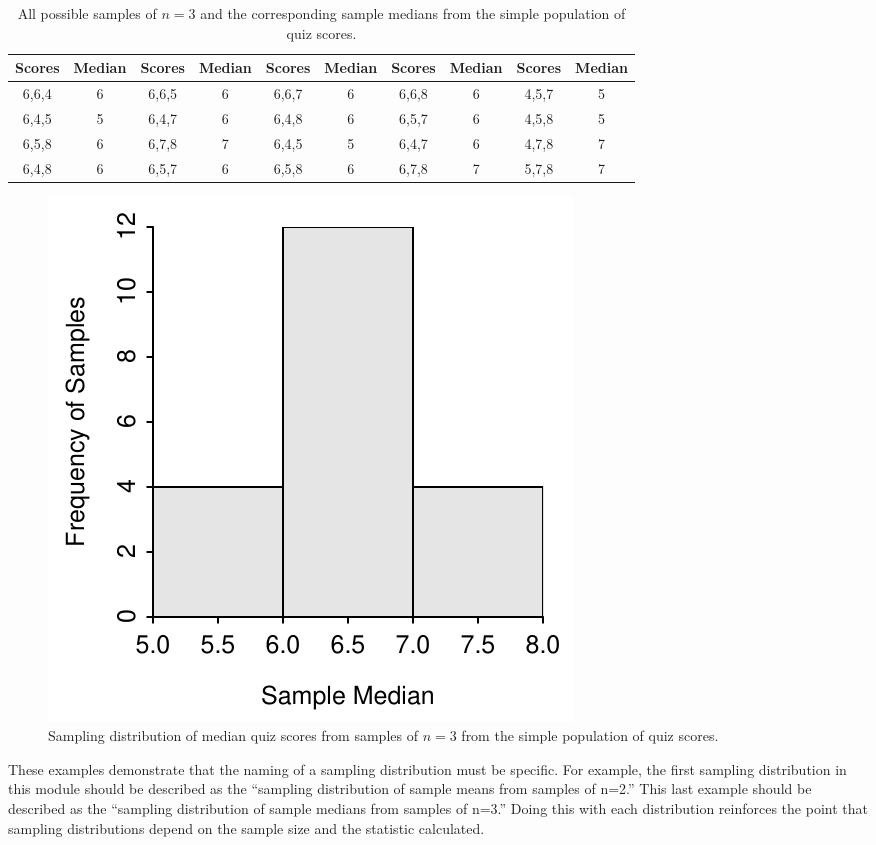 \documentclass[10pt,openany]{book}\usepackage[]{graphicx}\usepackage[]{color}
\newenvironment{knitrout}{}{} %
\begin{document}
\begin{table}[htbp]
  \caption{All possible samples of $n=3$ and the corresponding sample medians from the simple population of quiz scores.}
  \label{tab:SDistQuizMdns3}
  \centering
    \begin{tabular}{cc||cc||cc||cc||cc}
\hline\hline
Scores & Median & Scores & Median & Scores &  Median & Scores & Median & Scores & Median \\
\hline
6,6,4 & 6 & 6,6,5 & 6 & 6,6,7 & 6 & 6,6,8 & 6 & 4,5,7 & 5 \\
6,4,5 & 5 & 6,4,7 & 6 & 6,4,8 & 6 & 6,5,7 & 6 & 4,5,8 & 5 \\
6,5,8 & 6 & 6,7,8 & 7 & 6,4,5 & 5 & 6,4,7 & 6 & 4,7,8 & 7 \\
6,4,8 & 6 & 6,5,7 & 6 & 6,5,8 & 6 & 6,7,8 & 7 & 5,7,8 & 7 \\
\hline\hline
    \end{tabular}
\end{table}

\begin{knitrout}
\color{fgcolor}\begin{figure}[hbtp]

{\centering \includegraphics[width=.4\linewidth]{Figs/SDistQuizMdns3-1} 

}

\caption[Sampling distribution of median quiz scores from samples of $n=3$ from the simple population of quiz scores]{Sampling distribution of median quiz scores from samples of $n=3$ from the simple population of quiz scores.}\label{fig:SDistQuizMdns3}
\end{figure}


\end{knitrout}


These examples demonstrate that the naming of a sampling distribution must be specific.  For example, the first sampling distribution in this module should be described as the ``sampling distribution of sample means from samples of n=2.''  This last example should be described as the ``sampling distribution of sample medians from samples of n=3.''  Doing this with each distribution reinforces the point that sampling distributions depend on the sample size and the statistic calculated.
\end{document}
